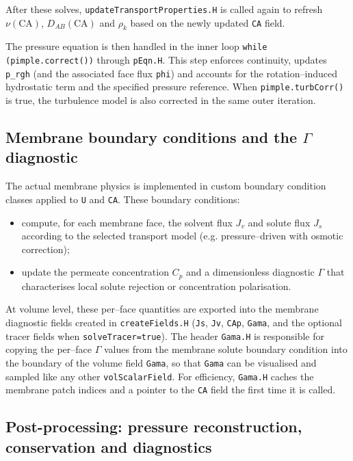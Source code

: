\documentclass[11pt,a4paper]{article}
\begin{document}
After these solves, \texttt{updateTransportProperties.H} is called again
to refresh \(\nu(\mathrm{CA})\), \(D_{AB}(\mathrm{CA})\) and \(\rho_k\)
based on the newly updated \texttt{CA} field.

The pressure equation is then handled in the inner loop
\texttt{while (pimple.correct())} through \texttt{pEqn.H}. This step
enforces continuity, updates \texttt{p\_rgh} (and the associated face
flux \texttt{phi}) and accounts for the rotation--induced hydrostatic
term and the specified pressure reference. When
\texttt{pimple.turbCorr()} is true, the turbulence model is also
corrected in the same outer iteration.

\subsection{Membrane boundary conditions and the \texorpdfstring{$\Gamma$}{Gamma} diagnostic}

The actual membrane physics is implemented in custom boundary condition
classes applied to \texttt{U} and \texttt{CA}. These boundary
conditions:

\begin{itemize}
	\item compute, for each membrane face, the solvent flux \(J_v\) and
	solute flux \(J_s\) according to the selected transport model
	(e.g. pressure--driven with osmotic correction);
	\item update the permeate concentration \(C_p\) and a dimensionless
	diagnostic \(\Gamma\) that characterises local solute rejection
	or concentration polarisation.
\end{itemize}

At volume level, these per--face quantities are exported into the
membrane diagnostic fields created in \texttt{createFields.H}
(\texttt{Js}, \texttt{Jv}, \texttt{CAp}, \texttt{Gama}, and the
optional tracer fields when \texttt{solveTracer=true}). The header
\texttt{Gama.H} is responsible for copying the per--face \(\Gamma\)
values from the membrane solute boundary condition into the boundary of
the volume field \texttt{Gama}, so that \texttt{Gama} can be visualised
and sampled like any other \texttt{volScalarField}. For efficiency,
\texttt{Gama.H} caches the membrane patch indices and a pointer to the
\texttt{CA} field the first time it is called.

\subsection{Post-processing: pressure reconstruction, conservation and diagnostics}
\end{document}
